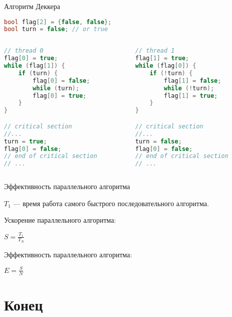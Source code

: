 \begin{frame}[fragile]{Алгоритм Деккера}

\begin{lstlisting}[language=C++,basicstyle=\ttfamily,keywordstyle=\color{blue},basicstyle=\scriptsize]
bool flag[2] = {false, false};
bool turn = false; // or true
\end{lstlisting}

\begin{columns}[t]
    \begin{column}[T]{0.45\textwidth}
        \begin{lstlisting}[language=C++,basicstyle=\ttfamily,keywordstyle=\color{blue},basicstyle=\scriptsize]
// thread 0
flag[0] = true;
while (flag[1]) {
    if (turn) {
        flag[0] = false;
        while (turn);
        flag[0] = true;
    }
}

// critical section
//...
turn = true;
flag[0] = false;
// end of critical section
// ...
        \end{lstlisting}
    \end{column}
    \begin{column}[T]{0.45\textwidth}
        \begin{lstlisting}[language=C++,basicstyle=\ttfamily,keywordstyle=\color{blue},basicstyle=\scriptsize]
// thread 1
flag[1] = true;
while (flag[0]) {
    if (!turn) {
        flag[1] = false;
        while (!turn);
        flag[1] = true;
    }
}

// critical section
//...
turn = false;
flag[0] = false;
// end of critical section
// ...
        \end{lstlisting}
    \end{column}
\end{columns}

\end{frame}

\begin{frame}{Эффективность параллельного алгоритма}

$T_1$ --- время работа самого быстрого последовательного алгоритма.

Ускорение параллельного алгоритма:

$S = \frac{T_1}{T_N}$

Эффективность параллельного алгоритма:

$E = \frac{S}{N}$

\end{frame}

\section{Конец}

